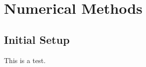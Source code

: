 \section{Numerical Methods}
\label{methods}

\subsection{Initial Setup}
\label{setup}

This is a test.